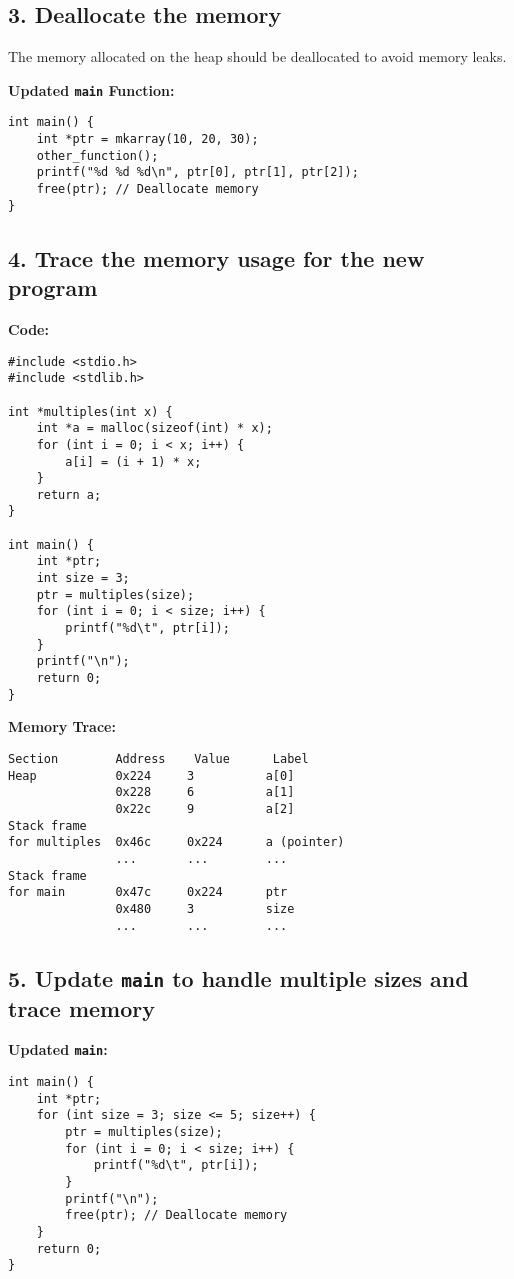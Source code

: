 \documentclass[12pt]{article}
\begin{document}
\subsection*{3. Deallocate the memory}
The memory allocated on the heap should be deallocated to avoid memory leaks.

\textbf{Updated \texttt{main} Function:}
\begin{lstlisting}
int main() {
    int *ptr = mkarray(10, 20, 30);
    other_function();
    printf("%d %d %d\n", ptr[0], ptr[1], ptr[2]);
    free(ptr); // Deallocate memory
}
\end{lstlisting}

\subsection*{4. Trace the memory usage for the new program}

\textbf{Code:}
\begin{lstlisting}
#include <stdio.h>
#include <stdlib.h>

int *multiples(int x) {
    int *a = malloc(sizeof(int) * x);
    for (int i = 0; i < x; i++) {
        a[i] = (i + 1) * x;
    }
    return a;
}

int main() {
    int *ptr;
    int size = 3;
    ptr = multiples(size);
    for (int i = 0; i < size; i++) {
        printf("%d\t", ptr[i]);
    }
    printf("\n");
    return 0;
}
\end{lstlisting}

\textbf{Memory Trace:}
\begin{verbatim}
Section        Address    Value      Label
Heap           0x224     3          a[0]
               0x228     6          a[1]
               0x22c     9          a[2]
Stack frame
for multiples  0x46c     0x224      a (pointer)
               ...       ...        ...
Stack frame
for main       0x47c     0x224      ptr
               0x480     3          size
               ...       ...        ...
\end{verbatim}

\subsection*{5. Update \texttt{main} to handle multiple sizes and trace memory}

\textbf{Updated \texttt{main}:}
\begin{lstlisting}
int main() {
    int *ptr;
    for (int size = 3; size <= 5; size++) {
        ptr = multiples(size);
        for (int i = 0; i < size; i++) {
            printf("%d\t", ptr[i]);
        }
        printf("\n");
        free(ptr); // Deallocate memory
    }
    return 0;
}
\end{lstlisting}
\end{document}
